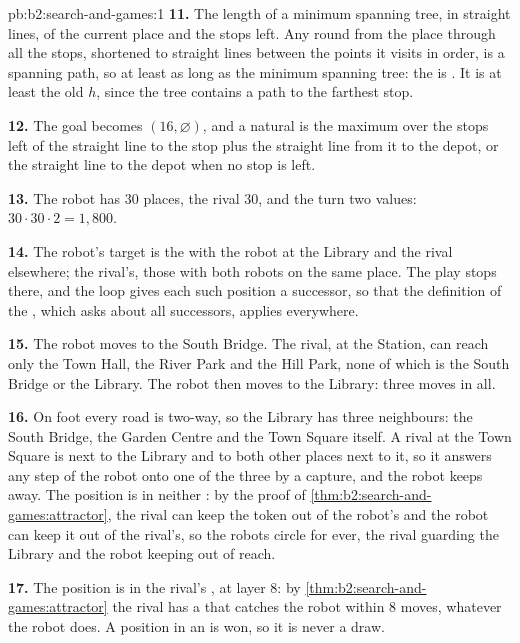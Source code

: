 \begin{solution}{pb:b2:search-and-games:1}
\textbf{11.} The length of a minimum spanning tree, in straight lines, of the current place and the stops left. Any round
from the place through all the stops, shortened to straight lines between the points it visits in order, is a spanning
path, so at least as long as the minimum spanning tree: the  is . It is at least the old $h$, since
the tree contains a path to the farthest stop.

\textbf{12.} The goal becomes $(16, \varnothing)$, and a natural  is the maximum over the stops left of
the straight line to the stop plus the straight line from it to the depot, or the straight line to the depot when no stop
is left.

\textbf{13.} The robot has 30 places, the rival 30, and the turn two values: $30 \cdot 30 \cdot 2 = 1{,}800$.

\textbf{14.} The robot's target is the  with the robot at the Library and the rival elsewhere; the rival's, those
with both robots on the same place. The play stops there, and the loop gives each such position a successor, so that the
definition of the , which asks about all successors, applies everywhere.

\textbf{15.} The robot moves to the South Bridge. The rival, at the Station, can reach only the Town Hall, the River Park and the Hill Park, none of which is the South Bridge or the
Library. The robot then moves to the Library: three moves
in all.

\textbf{16.} On foot every road is two-way, so the Library has three neighbours: the South Bridge, the Garden Centre
and the Town Square itself. A rival at the Town Square is next to the Library and to both other places next to it, so it
answers any step of the robot onto one of the three by a capture, and the robot keeps away. The position is in
neither : by the proof of \cref{thm:b2:search-and-games:attractor}, the rival can keep the token out of the
robot's  and the robot can keep it out of the rival's, so the robots circle for ever, the rival guarding the
Library and the robot keeping out of reach.

\textbf{17.} The position is in the rival's , at layer 8: by \cref{thm:b2:search-and-games:attractor} the rival
has a  that catches the robot within 8 moves, whatever the robot does. A position in an  is won, so it is
never a draw.


\end{solution}
